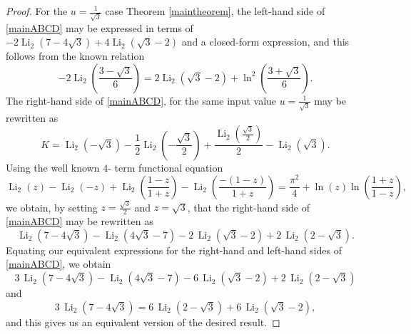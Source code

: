 \documentclass[12pt]{article}
\begin{document}
\begin{proof}
 For the $u = \frac{1}{\sqrt{3}}$ case Theorem \ref{maintheorem}, 
 the left-hand side of \eqref{mainABCD} 
 may be expressed in terms of 
 $ -2 \operatorname{Li}_2 \left( 7 - 4 \sqrt{3} \right) + 
 4 \operatorname{Li}_2 \left( \sqrt{3} - 2 \right) $ and a closed-form expression, 
 and this follows from the known relation 
\begin{equation*}
-2 \operatorname{Li}_2 \left( \frac{3 - \sqrt{3}}{6} \right) = 2 \operatorname{Li}_2 \left( \sqrt{3} - 2 \right) + 
 \ln^{2} \left( \frac{3 + \sqrt{3}}{6} \right). 
\end{equation*}
 The right-hand side of \eqref{mainABCD}, for the same input value 
 $u = \frac{1}{\sqrt{3}}$ may be rewritten as 
 $$ K = \operatorname{Li}_2\left(-\sqrt{3}\right)-\frac{1}{2}
 \operatorname{Li}_2\left(-\frac{\sqrt{3}}{2}\right) + 
 \frac{\operatorname{Li}_2\left(\frac{\sqrt{3}}{2}\right)}{2}-\operatorname{Li}_2\left(\sqrt{3}\right). $$
 Using the well known $4$- term functional equation 
\begin{equation}\label{wellknown4term}
 \operatorname{Li}_2(z) - \operatorname{Li}_2(-z) + 
 \operatorname{Li}_2\left(\frac{1 - z}{1 + z}\right) - 
 \operatorname{Li}_2\left(\frac{-(1 - z)}{1 + z}\right) = \frac{\pi^2}{4} + \ln(z) \ln\left(\frac{1 + z}{1 - z}\right), 
\end{equation}
 we obtain, by setting $z = \frac{\sqrt{3}}{2}$ and $z=\sqrt{3}$, that the right-hand side of \eqref{mainABCD} may be rewritten as 
\begin{equation*}
 \operatorname{Li}_2\left(7 - 4 \sqrt{3}\right) - \operatorname{Li}_2\left(4 \sqrt{3} - 7 \right) - 
 2 \, \operatorname{Li}_2\left(\sqrt{3} - 2\right) + 2 \, \operatorname{Li}_2\left(2 - \sqrt{3}\right). 
\end{equation*}
 Equating our equivalent expressions for the right-hand and left-hand sides of \eqref{mainABCD}, we obtain 
\begin{equation*}
 3 \, \operatorname{Li}_2\left(7 - 4 \sqrt{3}\right) - 
 \operatorname{Li}_2\left(4 \sqrt{3} - 7\right) - 
 6 \, \operatorname{Li}_2\left(\sqrt{3} - 2\right) + 2 \, \operatorname{Li}_2\left(2 - \sqrt{3}\right)
\end{equation*}
 and 
\begin{equation*}
 3 \, \operatorname{Li}_2\left(7 - 4 \sqrt{3}\right) = 6 \, 
 \operatorname{Li}_2\left(2 - \sqrt{3}\right) + 6 \, \operatorname{Li}_2\left(\sqrt{3} - 2\right), 
\end{equation*}
 and this gives us an equivalent version of the desired result. 
\end{proof}
\end{document}
